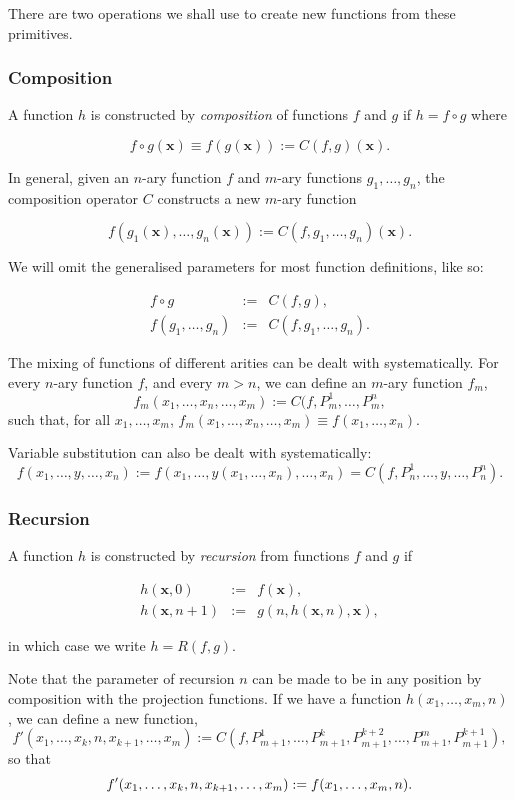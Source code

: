 \documentclass[a4paper]{article}
\newcommand{\xvec}{\mathbf{x}}	%
\theoremstyle{plain}
\theoremstyle{definition}
\begin{document}
There are two operations we shall use to create new functions from these primitives.

\subsubsection{Composition} 

A function $h$ is constructed by {\it composition} of functions $f$ and $g$ if $h = f \circ g$ where

\[f \circ g(\xvec) \equiv f(g(\xvec)) := C(f,g)(\xvec).\] 

In general, given an $n$-ary function $f$ and $m$-ary functions $g_1, \dots, g_n$, the composition operator $C$ constructs a new $m$-ary function

\[f(g_1(\xvec),\dots, g_n(\xvec)) := C(f,g_1, \dots, g_n)(\xvec).\]

We will omit the generalised parameters for most function definitions, like so:

\begin{eqnarray*}
	f \circ g &:=& C(f,g), \\
	f(g_1, \dots, g_n) &:=& C(f,g_1, \dots, g_n).
\end{eqnarray*}

The mixing of functions of different arities can be dealt with systematically. For every $n$-ary function $f$, and every $m > n$, we can define an $m$-ary function $f_m$, 
\[f_m(x_1, \dots, x_n, \dots, x_m) := C(f,P_m^1, \dots, P_m^n,\]
such that, for all $x_1, \dots, x_m$, $f_m(x_1, \dots, x_n, \dots, x_m) \equiv f(x_1, \dots, x_n)$.

Variable substitution can also be dealt with systematically:
\[f(x_1, \dots, y, \dots, x_n) := f(x_1, \dots, y(x_1, \dots, x_n), \dots, x_n) = C(f,P_n^1, \dots, y, \dots, P_n^n). \]

\subsubsection{Recursion}

A function $h$ is constructed by {\it recursion} from functions $f$ and $g$ if

\begin{eqnarray*}
	h(\xvec,0) & := & f(\xvec), \\
	h(\xvec,n+1) & := & g(n,h(\xvec,n),\xvec),
\end{eqnarray*} 

in which case we write $h = R(f,g)$.

Note that the parameter of recursion $n$ can be made to be in any position by composition with the projection functions. If we have a function $h(x_1,\dots,x_m,n)$, we can define a new function,
\[ f'(x_1, \dots, x_k, n, x_{k+1}, \dots, x_m) := C(f, P_{m+1}^1, \dots, P_{m+1}^k, P_{m+1}^{k+2},\dots, P_{m+1}^m, P_{m+1}^{k+1}), \]
so that 
\[ f'(x_1, \dots, x_k, n, x_{k+1}, \dots, x_m) := f(x_1, \dots, x_m, n). \\ \]
\end{document}
